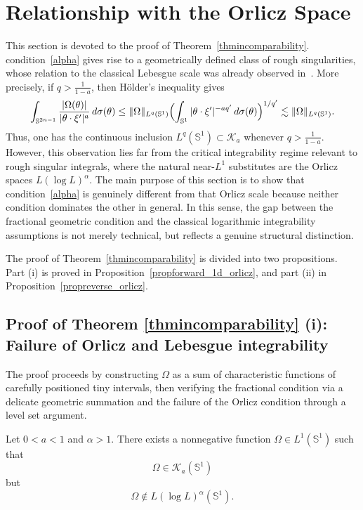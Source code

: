 \documentclass[11pt]{amsart}
\begin{document}
\section{Relationship with the Orlicz Space}\label{sec4}

This section is devoted to the proof of Theorem~\ref{thmincomparability}. condition~\eqref{alpha} gives rise to a geometrically defined class of rough singularities, whose relation to the classical Lebesgue scale was already observed in~\cite{Duoandikoetxea}. More precisely, if $q>\frac{1}{1-a}$, then H\"older's inequality gives
\[
\int_{\mathbb{S}^{2n-1}}\frac{|\Omega(\theta)|}{|\theta\cdot\xi'|^a}\,d\sigma(\theta)
\leq
\|\Omega\|_{L^q(\mathbb{S}^{1})}
\Bigl(\int_{\mathbb{S}^{1}}|\theta\cdot\xi'|^{-aq'}\,d\sigma(\theta)\Bigr)^{1/q'}
\lesssim
\|\Omega\|_{L^q(\mathbb{S}^{1})}.
\]
Thus, one has the continuous inclusion $L^q(\mathbb{S}^{1})\subset \mathcal K_a$ whenever $q>\frac{1}{1-a}$. However, this observation lies far from the critical integrability regime relevant to rough singular integrals, where the natural near-$L^1$ substitutes are the Orlicz spaces $L(\log L)^\alpha$. The main purpose of this section is to show that condition~\eqref{alpha} is genuinely different from that Orlicz scale because neither condition dominates the other in general. In this sense, the gap between the fractional geometric condition and the classical logarithmic integrability assumptions is not merely technical, but reflects a genuine structural distinction.

The proof of Theorem~\ref{thmincomparability} is divided into two propositions. Part (i) is proved in Proposition~\ref{propforward_1d_orlicz}, and part (ii) in Proposition~\ref{propreverse_orlicz}.

\subsection{Proof of Theorem \ref{thmincomparability} (i): Failure of Orlicz and Lebesgue integrability}
The proof proceeds by constructing $\Omega$ as a sum of characteristic functions of carefully positioned tiny intervals, then verifying the fractional condition via a delicate geometric summation and the failure of the Orlicz condition through a level set argument.

\begin{proposition}\label{propforward_1d_orlicz}
	Let $0<a<1$ and $\alpha>1$. There exists a nonnegative function
	$\Omega \in L^1(\mathbb{S}^1)$ such that
	\[
	\Omega\in \mathcal K_a(\mathbb{S}^1)
	\]
	but
	\[
	\Omega\notin L(\log L)^\alpha(\mathbb{S}^1).
	\]
\end{proposition}
\end{document}
